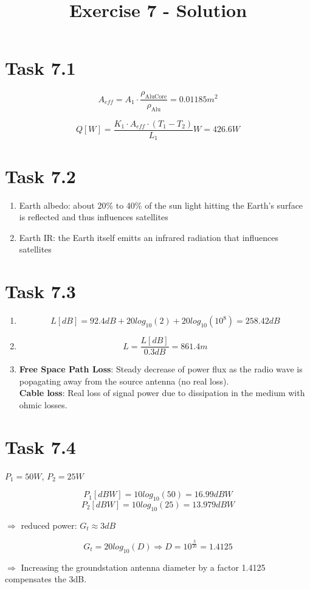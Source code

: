 \documentclass[a4paper,12pt]{article}
\title{Exercise 7 - Solution}
\author{}
\date{}
\begin{document}
\maketitle

\section*{Task 7.1}
\[A_{eff} = A_1\cdot \frac{\rho_{\text{AluCore}}}{\rho_{\text{Alu}}} = 0.01185m^2\]

\[Q[W] = \frac{K_1\cdot A_{eff}\cdot (T_1-T_2)}{L_1} W = 426.6W\]

\section*{Task 7.2}
 \begin{enumerate}
  \item Earth albedo: about 20\% to 40\% of the sun light hitting the Earth's surface is reflected and thus influences satellites 
  \item Earth IR: the Earth itself emitts an infrared radiation that influences satellites
 \end{enumerate}


\section*{Task 7.3}

\begin{enumerate}
 \item \[L[dB] = 92.4dB + 20log_{10}(2) + 20log_{10}(10^8) = 258.42dB\]
 \item \[L = \frac{L[dB]}{0.3dB} = 861.4m\]
 \item \textbf{Free Space Path Loss}:
Steady decrease of power flux as the radio wave is popagating away from the source antenna (no real loss).\\
\textbf{Cable loss}:
Real loss of signal power due to dissipation in the medium with ohmic losses.
\end{enumerate}

\section*{Task 7.4}
$P_1 = 50W$, $P_2 = 25W$

\[P_1[dBW] = 10log_{10}(50) = 16.99dBW\]
\[P_2[dBW] = 10log_{10}(25) = 13.979dBW\]

\noindent $\Rightarrow$ reduced power: $G_t \approx 3dB$ 

\[G_t = 20log_{10}(D) \Rightarrow D = 10^{\frac{3}{20}} = 1.4125\]

\noindent $\Rightarrow$ Increasing the groundstation antenna diameter by a factor 1.4125 compensates the 3dB.
\end{document}
